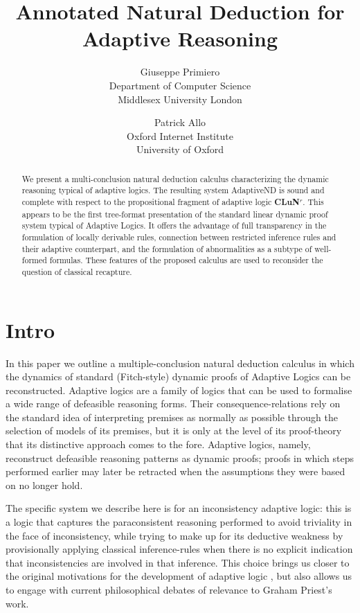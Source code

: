 \documentclass[]{article}
\title{Annotated Natural Deduction for Adaptive Reasoning}
\author{Giuseppe Primiero\\
Department of Computer Science\\
Middlesex University London\\
 \and Patrick Allo\\
 Oxford Internet Institute\\
 University of Oxford}
\date{}
\begin{document}
\maketitle

\begin{abstract}
We present a multi-conclusion natural deduction calculus characterizing the dynamic reasoning typical of adaptive logics. The resulting system {\sf AdaptiveND} is sound and complete with respect to the propositional fragment of adaptive logic \textbf{CLuN$^r$}. This appears to be the first tree-format presentation of the standard linear dynamic proof system typical of Adaptive Logics. It offers the advantage of full transparency in the formulation of locally derivable rules, connection between restricted inference rules and their adaptive counterpart, and the formulation of abnormalities as a subtype of well-formed formulas. These features of the proposed calculus are used to reconsider the question of classical recapture. 
\end{abstract}

\section{Intro}

In this paper we outline a multiple-conclusion natural deduction calculus in which the dynamics of standard (Fitch-style) dynamic proofs of Adaptive Logics \cite{batens07} can be reconstructed. Adaptive logics are a family of logics that can be used to formalise a wide range of defeasible reasoning forms. Their consequence-relations rely on the standard idea of interpreting premises as normally as possible through the selection of models of its premises, but it is only at the level of its proof-theory that its distinctive approach comes to the fore. Adaptive logics, namely, reconstruct defeasible reasoning patterns as dynamic proofs; proofs in which steps performed earlier may later be retracted when the assumptions they were based on no longer hold.

The specific system we describe here is for an inconsistency adaptive logic: this is a logic that captures the paraconsistent reasoning performed to avoid triviality in the face of inconsistency, while trying to make up for its deductive weakness by provisionally applying classical inference-rules when there is no explicit indication that inconsistencies are involved in that inference. This choice brings us closer to the original motivations for the development of adaptive logic \cite{Batens:ParaconsistentLogicEssaysOnTheInconsistent:1989}, but also allows us to engage with current philosophical debates of relevance to Graham Priest's work.
\end{document}
